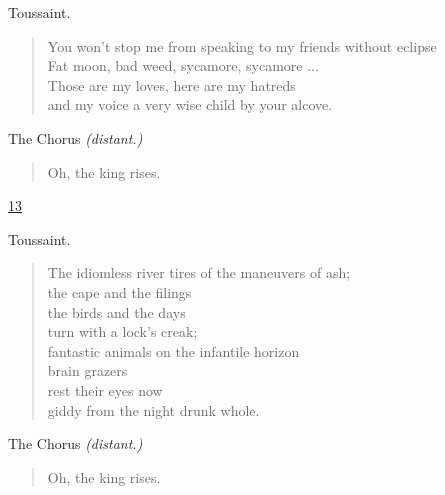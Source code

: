 \documentclass[letterpaper,article,12pt,oneside,notitlepage]{memoir}
\begin{document}
\begin{center}Toussaint.\end{center}

\begin{verse}
\hspace{1cm} You won't stop me from speaking to my friends without eclipse \\
Fat moon, bad weed, sycamore, sycamore ... \\
Those are my loves, here are my hatreds \\
and my voice a very wise child by your alcove. \\
\end{verse}

\begin{center}The Chorus \textit{(distant.)}\end{center}

\begin{verse}
\hspace{1cm} Oh, the king rises. \\
\end{verse}

\clearpage

\href{http://cesaire.elotroalex.com/chiens/chiens/p013.html}{13}

\begin{center}Toussaint.\end{center}

\begin{verse}
\hspace{1cm} The idiomless river tires of the maneuvers of ash; \\
the cape and the filings \\
the birds and the days \\
turn with a lock's creak; \\
fantastic animals on the infantile horizon \\
brain grazers \\
rest their eyes now \\
giddy from the night drunk whole. \\
\end{verse}

\begin{center}The Chorus \textit{(distant.)}\end{center}

\begin{verse}
\hspace{1cm} Oh, the king rises. \\
\end{verse}
\end{document}
